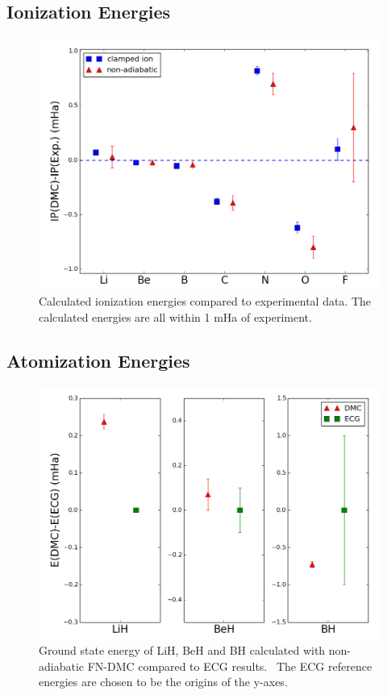\documentclass[pra,superscriptaddress,groupedaddress,twocolumn]{revtex4}
\begin{document}
\subsection{Ionization Energies}

\begin{figure}[h]
\centering
\includegraphics[scale=.4]{Figures/ionization}
\caption{Calculated ionization energies compared to experimental data. The calculated energies are all within 1 mHa of experiment.}
\end{figure}



\subsection{Atomization Energies}

\begin{figure}
\centering
\includegraphics[scale=.4]{Figures/dia-ECG}
\caption{Ground state energy of LiH, BeH and BH calculated with non-adiabatic FN-DMC compared to ECG results.~\cite{Adamowicz_LiH,Koput_BeH,Miliordos_BH} The ECG reference energies are chosen to be the origins of the y-axes.}
\end{figure}
\end{document}
